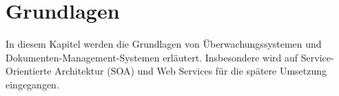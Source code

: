 \section{Grundlagen}
In diesem Kapitel werden die Grundlagen von Überwachungssystemen und Dokumenten-Management-Systemen erläutert.
Insbesondere wird auf Service-Orientierte Architektur (\gls{SOA}) und Web Services für die spätere Umsetzung eingegangen.














